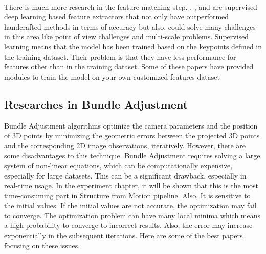 \documentclass[11pt]{article}
\begin{document}
    \paragraph{} There is much more research in the feature matching step. \cite{revaud2019r2d2}, \cite{dusmanu2019d2net},
    and \cite{detone2018superpoint} are supervised deep learning based feature extractors that not only have
    outperformed handcrafted methods in terms of accuracy but also, could solve many challenges in this area like
    point of view challenges and multi-scale problems. Supervised learning means that the model has been trained
    based on the keypoints defined in the training dataset. Their problem is that they have less performance for features other
    than in the training dataset. Some of these papers have provided modules to train the model on your own customized features dataset

    \newpage
    \subsection{Researches in Bundle Adjustment}
    Bundle Adjustment algorithms optimize the camera parameters and the position of 3D points by minimizing the
    geometric errors between the projected 3D points and the corresponding 2D image observations, iteratively. However, there
    are some disadvantages to this technique. Bundle Adjustment requires solving a large system of
    non-linear equations, which can be computationally expensive, especially for large datasets. This can be a
    significant drawback, especially in real-time usage. In the experiment chapter, it will be shown that this is the most time-consuming part in Structure from Motion pipeline.
    Also, It is sensitive to the initial values. If the initial values are not accurate, the optimization may fail to converge.
    The optimization problem can have many local minima which means a high probability to converge to incorrect results.
    Also, the error may increase exponentially in the subsequent iterations. Here are some of the best papers focusing on these issues.
\end{document}
